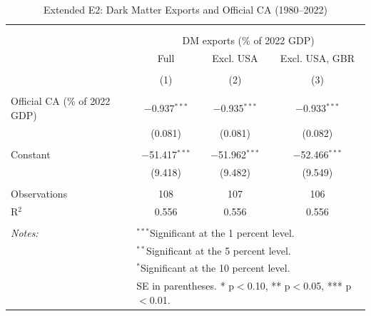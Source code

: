 \documentclass[11pt]{article}
\begin{document}
\small
\setcounter{table}{2}

\renewcommand{\thetable}{E2}
\begin{table}[!htbp] \centering 
  \caption{Extended E2: Dark Matter Exports and Official CA (1980--2022)} 
  \label{tab:E2_ext} 
\begin{tabular}{@{\extracolsep{5pt}}lccc} 
\\[-1.8ex]\hline 
\hline \\[-1.8ex] 
\\[-1.8ex] & \multicolumn{3}{c}{DM exports (\% of 2022 GDP)} \\ 
 & Full & Excl. USA & Excl. USA, GBR \\ 
\\[-1.8ex] & (1) & (2) & (3)\\ 
\hline \\[-1.8ex] 
 Official CA (\% of 2022 GDP) & $-$0.937$^{***}$ & $-$0.935$^{***}$ & $-$0.933$^{***}$ \\ 
  & (0.081) & (0.081) & (0.082) \\ 
  & & & \\ 
 Constant & $-$51.417$^{***}$ & $-$51.962$^{***}$ & $-$52.466$^{***}$ \\ 
  & (9.418) & (9.482) & (9.549) \\ 
  & & & \\ 
Observations & 108 & 107 & 106 \\ 
R$^{2}$ & 0.556 & 0.556 & 0.556 \\ 
\hline \\[-1.8ex] 
\textit{Notes:} & \multicolumn{3}{l}{$^{***}$Significant at the 1 percent level.} \\ 
 & \multicolumn{3}{l}{$^{**}$Significant at the 5 percent level.} \\ 
 & \multicolumn{3}{l}{$^{*}$Significant at the 10 percent level.} \\ 
 & \multicolumn{3}{l}{SE in parentheses. * p$<$0.10, ** p$<$0.05, *** p$<$0.01.} \\ 
\end{tabular} 
\end{table} 
\end{document}
